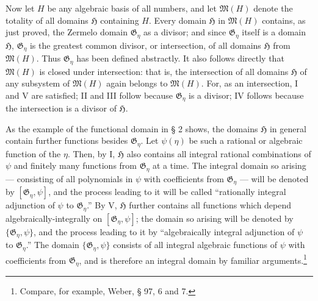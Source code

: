 \documentclass[11pt]{article}
\begin{document}
Now let $H$ be any algebraic basis of all numbers, and let $\mathfrak M(H)$
denote the totality of all domains $\mathfrak H$ containing $H$. Every domain
$\mathfrak H$ in $\mathfrak M(H)$ contains, as just proved, the Zermelo domain
$\mathfrak G_\eta$ as a divisor; and since $\mathfrak G_\eta$ itself is a domain
$\mathfrak H$, $\mathfrak G_\eta$ is the greatest common divisor, or
intersection, of all domains $\mathfrak H$ from $\mathfrak M(H)$. Thus
$\mathfrak G_\eta$ has been defined abstractly. It also follows directly that
$\mathfrak M(H)$ is closed under intersection: that is, the intersection of all
domains $\mathfrak H$ of any subsystem of $\mathfrak M(H)$ again belongs to
$\mathfrak M(H)$. For, as an intersection, I and V are satisfied; II and III
follow because $\mathfrak G_\eta$ is a divisor; IV follows because the
intersection is a divisor of $\mathfrak H$.

As the example of the functional domain in § 2 shows, the domains $\mathfrak H$
in general contain further functions besides $\mathfrak G_\eta$. Let
$\psi(\eta)$ be such a rational or algebraic function of the $\eta$. Then, by I,
$\mathfrak H$ also contains all integral rational combinations of $\psi$ and
finitely many functions from $\mathfrak G_\eta$ at a time. The integral domain so
arising --- consisting of all polynomials in $\psi$ with coefficients from
$\mathfrak G_\eta$ --- will be denoted by $[\mathfrak G_\eta,\psi]$, and the
process leading to it will be called ``rationally integral adjunction of $\psi$
to $\mathfrak G_\eta$.'' By V, $\mathfrak H$ further contains all functions which
depend algebraically-integrally on $[\mathfrak G_\eta,\psi]$; the domain so
arising will be denoted by $\{\mathfrak G_\eta,\psi\}$, and the process leading
to it by ``algebraically integral adjunction of $\psi$ to $\mathfrak G_\eta$.''
The domain $\{\mathfrak G_\eta,\psi\}$ consists of all integral algebraic
functions of $\psi$ with coefficients from $\mathfrak G_\eta$, and is therefore
an integral domain by familiar arguments.\footnote{Compare, for example, Weber,
§ 97, 6 and 7.}
\end{document}

